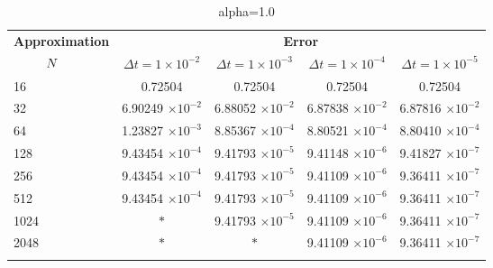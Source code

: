 	\begin{table}
	\begin{tabular}{lcccc}
		\toprule
		\multicolumn{1}{c}{\textbf{Approximation}} & \multicolumn{4}{c}{\textbf{Error}} \\
		$\hspace{9mm}N$ & $\Delta t=1\times 10^{-2}$ & $\Delta t=1\times 10^{-3}$ & $\Delta t=1\times 10^{-4}$ & $\Delta t=1\times 10^{-5}$ \\
		\midrule
		\hspace{7mm} 16 & 0.72504    & 0.72504    & 0.72504    & 0.72504    \\
		\midrule
		\hspace{7mm} 32 & 6.90249 $\times 10 ^{-2}$   & 6.88052 $\times 10 ^{-2}$   & 6.87838 $\times 10 ^{-2}$   & 6.87816 $\times 10 ^{-2}$   \\
		\midrule
		\hspace{7mm} 64 & 1.23827 $\times 10 ^{-3}$  & 8.85367 $\times 10 ^{-4}$ & 8.80521 $\times 10 ^{-4}$ & 8.80410 $\times 10 ^{-4}$  \\
		\midrule
		\hspace{7mm} 128 & 9.43454 $\times 10 ^{-4}$ & 9.41793 $\times 10 ^{-5}$ & 9.41148 $\times 10 ^{-6}$ & 9.41827 $\times 10 ^{-7}$  \\
		\midrule
		\hspace{7mm} 256 & 9.43454 $\times 10 ^{-4}$ & 9.41793 $\times 10 ^{-5}$ & 9.41109 $\times 10 ^{-6}$ & 9.36411 $\times 10 ^{-7}$ \\
		\midrule
		\hspace{7mm} 512 & 9.43454 $\times 10 ^{-4}$ & 9.41793 $\times 10 ^{-5}$ & 9.41109 $\times 10 ^{-6}$ & 9.36411 $\times 10 ^{-7}$ \\
		\midrule
		\hspace{7mm} 1024 & $\ast$ & 9.41793 $\times 10^{-5}$ & 9.41109 $\times 10^{-6}$ & 9.36411 $\times 10^{-7}$              \\
		\midrule
		\hspace{7mm} 2048 & $\ast$ & $\ast$ & 9.41109 $\times 10^{-6}$ & 9.36411 $\times 10^{-7}$   \\
		\\
		\bottomrule
	\end{tabular}
	\caption{alpha=1.0}
	\end{table}

